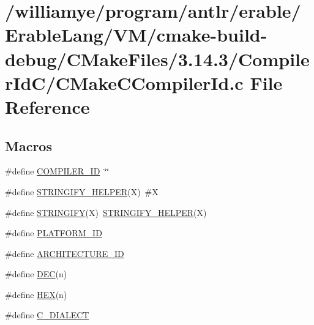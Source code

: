 \hypertarget{_v_m_2cmake-build-debug_2_c_make_files_23_814_83_2_compiler_id_c_2_c_make_c_compiler_id_8c}{}\section{/williamye/program/antlr/erable/\+Erable\+Lang/\+V\+M/cmake-\/build-\/debug/\+C\+Make\+Files/3.14.3/\+Compiler\+Id\+C/\+C\+Make\+C\+Compiler\+Id.c File Reference}
\label{_v_m_2cmake-build-debug_2_c_make_files_23_814_83_2_compiler_id_c_2_c_make_c_compiler_id_8c}
\subsection*{Macros}
\begin{DoxyCompactItemize}
\item 
\#define \mbox{\hyperlink{_v_m_2cmake-build-debug_2_c_make_files_23_814_83_2_compiler_id_c_2_c_make_c_compiler_id_8c_a81dee0709ded976b2e0319239f72d174}{C\+O\+M\+P\+I\+L\+E\+R\+\_\+\+ID}}~\char`\"{}\char`\"{}
\item 
\#define \mbox{\hyperlink{_v_m_2cmake-build-debug_2_c_make_files_23_814_83_2_compiler_id_c_2_c_make_c_compiler_id_8c_a2ae9b72bb13abaabfcf2ee0ba7d3fa1d}{S\+T\+R\+I\+N\+G\+I\+F\+Y\+\_\+\+H\+E\+L\+P\+ER}}(X)~\#X
\item 
\#define \mbox{\hyperlink{_v_m_2cmake-build-debug_2_c_make_files_23_814_83_2_compiler_id_c_2_c_make_c_compiler_id_8c_a43e1cad902b6477bec893cb6430bd6c8}{S\+T\+R\+I\+N\+G\+I\+FY}}(X)~\mbox{\hyperlink{_v_m_2cmake-build-debug_2_c_make_files_23_814_83_2_compiler_id_c_x_x_2_c_make_c_x_x_compiler_id_8cpp_a2ae9b72bb13abaabfcf2ee0ba7d3fa1d}{S\+T\+R\+I\+N\+G\+I\+F\+Y\+\_\+\+H\+E\+L\+P\+ER}}(X)
\item 
\#define \mbox{\hyperlink{_v_m_2cmake-build-debug_2_c_make_files_23_814_83_2_compiler_id_c_2_c_make_c_compiler_id_8c_adbc5372f40838899018fadbc89bd588b}{P\+L\+A\+T\+F\+O\+R\+M\+\_\+\+ID}}
\item 
\#define \mbox{\hyperlink{_v_m_2cmake-build-debug_2_c_make_files_23_814_83_2_compiler_id_c_2_c_make_c_compiler_id_8c_aba35d0d200deaeb06aee95ca297acb28}{A\+R\+C\+H\+I\+T\+E\+C\+T\+U\+R\+E\+\_\+\+ID}}
\item 
\#define \mbox{\hyperlink{_v_m_2cmake-build-debug_2_c_make_files_23_814_83_2_compiler_id_c_2_c_make_c_compiler_id_8c_ad1280362da42492bbc11aa78cbf776ad}{D\+EC}}(n)
\item 
\#define \mbox{\hyperlink{_v_m_2cmake-build-debug_2_c_make_files_23_814_83_2_compiler_id_c_2_c_make_c_compiler_id_8c_a46d5d95daa1bef867bd0179594310ed5}{H\+EX}}(n)
\item 
\#define \mbox{\hyperlink{_v_m_2cmake-build-debug_2_c_make_files_23_814_83_2_compiler_id_c_2_c_make_c_compiler_id_8c_a07f8e5783674099cd7f5110e22a78cdb}{C\+\_\+\+D\+I\+A\+L\+E\+CT}}
\end{DoxyCompactItemize}
